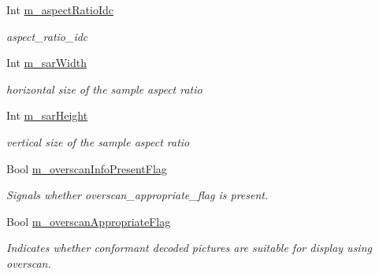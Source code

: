 \begin{DoxyCompactItemize}
\mbox{\label{class_t_app_enc_cfg_af6d1f77dca2496b06955c8aed62522c5}} 
Int \hyperlink{class_t_app_enc_cfg_af6d1f77dca2496b06955c8aed62522c5}{m\+\_\+aspect\+Ratio\+Idc}
\begin{DoxyCompactList}\small\item\em aspect\+\_\+ratio\+\_\+idc \end{DoxyCompactList}\item 
\mbox{\label{class_t_app_enc_cfg_aaa945170c5010507367a7a185cfe1ad9}} 
Int \hyperlink{class_t_app_enc_cfg_aaa945170c5010507367a7a185cfe1ad9}{m\+\_\+sar\+Width}
\begin{DoxyCompactList}\small\item\em horizontal size of the sample aspect ratio \end{DoxyCompactList}\item 
\mbox{\label{class_t_app_enc_cfg_a3135d0f9a8f854ecac3dca6cf35ea5df}} 
Int \hyperlink{class_t_app_enc_cfg_a3135d0f9a8f854ecac3dca6cf35ea5df}{m\+\_\+sar\+Height}
\begin{DoxyCompactList}\small\item\em vertical size of the sample aspect ratio \end{DoxyCompactList}\item 
\mbox{\label{class_t_app_enc_cfg_a5e285a83282bfabd5fae65ccf8eaf5c7}} 
Bool \hyperlink{class_t_app_enc_cfg_a5e285a83282bfabd5fae65ccf8eaf5c7}{m\+\_\+overscan\+Info\+Present\+Flag}
\begin{DoxyCompactList}\small\item\em Signals whether overscan\+\_\+appropriate\+\_\+flag is present. \end{DoxyCompactList}\item 
\mbox{\label{class_t_app_enc_cfg_a24643c2aa3795c3fcf73e3c91eaee624}} 
Bool \hyperlink{class_t_app_enc_cfg_a24643c2aa3795c3fcf73e3c91eaee624}{m\+\_\+overscan\+Appropriate\+Flag}
\begin{DoxyCompactList}\small\item\em Indicates whether conformant decoded pictures are suitable for display using overscan. \end{DoxyCompactList}\item 
\mbox{\label{class_t_app_enc_cfg_ac728d6fa6fd161b90814defce0585681}} 

\end{DoxyCompactItemize}
